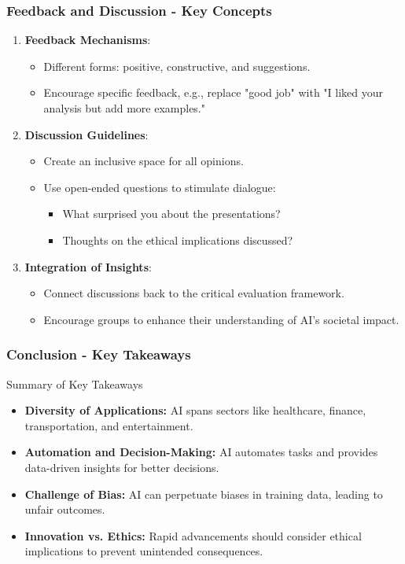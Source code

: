 \documentclass[aspectratio=169]{beamer}
\begin{document}
\begin{frame}[fragile]
    \frametitle{Feedback and Discussion - Key Concepts}
    \begin{enumerate}
        \item \textbf{Feedback Mechanisms}:
            \begin{itemize}
                \item Different forms: positive, constructive, and suggestions.
                \item Encourage specific feedback, e.g., replace "good job" with "I liked your analysis but add more examples."
            \end{itemize}
        \item \textbf{Discussion Guidelines}:
            \begin{itemize}
                \item Create an inclusive space for all opinions.
                \item Use open-ended questions to stimulate dialogue:
                    \begin{itemize}
                        \item What surprised you about the presentations?
                        \item Thoughts on the ethical implications discussed?
                    \end{itemize}
            \end{itemize}
        \item \textbf{Integration of Insights}:
            \begin{itemize}
                \item Connect discussions back to the critical evaluation framework.
                \item Encourage groups to enhance their understanding of AI's societal impact.
            \end{itemize}
    \end{enumerate}
\end{frame}

\begin{frame}[fragile]
    \frametitle{Conclusion - Key Takeaways}
    \begin{block}{Summary of Key Takeaways}
        \begin{itemize}
            \item \textbf{Diversity of Applications:} AI spans sectors like healthcare, finance, transportation, and entertainment.
            \item \textbf{Automation and Decision-Making:} AI automates tasks and provides data-driven insights for better decisions.
            \item \textbf{Challenge of Bias:} AI can perpetuate biases in training data, leading to unfair outcomes.
            \item \textbf{Innovation vs. Ethics:} Rapid advancements should consider ethical implications to prevent unintended consequences.
        \end{itemize}
    \end{block}
\end{frame}
\end{document}
